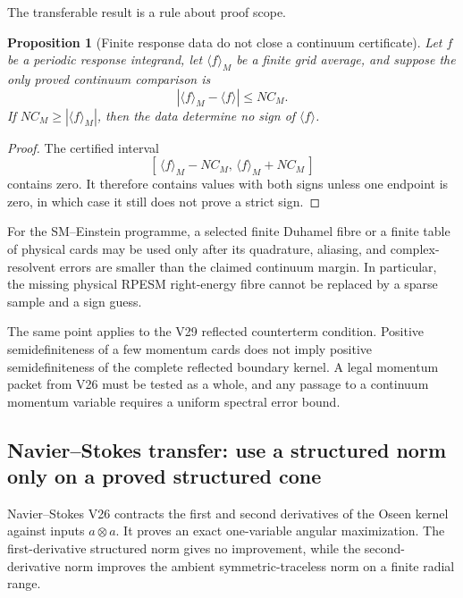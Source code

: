 \documentclass[11pt]{article}
\newtheorem{proposition}[theorem]{Proposition}
\theoremstyle{remark}
\begin{document}
The transferable result is a rule about proof scope.

\begin{proposition}[Finite response data do not close a continuum
certificate]
\label{prop:v12v30-finite-not-continuum}
Let \(f\) be a periodic response integrand, let
\(\langle f\rangle_M\) be a finite grid average, and suppose the only
proved continuum comparison is
\begin{equation}
 \left|\langle f\rangle_M-\langle f\rangle\right|
 \leq N C_M.                                      \tag{30.3}
\end{equation}
If \(NC_M\geq|\langle f\rangle_M|\), then the data determine no sign
of \(\langle f\rangle\).
\end{proposition}

\begin{proof}
The certified interval
\[
 [\,\langle f\rangle_M-NC_M,\,
    \langle f\rangle_M+NC_M\,]
\]
contains zero.  It therefore contains values with both signs unless
one endpoint is zero, in which case it still does not prove a strict
sign.
\end{proof}

For the SM--Einstein programme, a selected finite Duhamel fibre or a
finite table of physical cards may be used only after its quadrature,
aliasing, and complex-resolvent errors are smaller than the claimed
continuum margin.  In particular, the missing physical RPESM
right-energy fibre cannot be replaced by a sparse sample and a sign
guess.

The same point applies to the V29 reflected counterterm condition.
Positive semidefiniteness of a few momentum cards does not imply
positive semidefiniteness of the complete reflected boundary kernel.
A legal momentum packet from V26 must be tested as a whole, and any
passage to a continuum momentum variable requires a uniform spectral
error bound.

\subsection{Navier--Stokes transfer: use a structured norm only on a
proved structured cone}

Navier--Stokes V26 contracts the first and second derivatives of the
Oseen kernel against inputs \(a\otimes a\).  It proves an exact
one-variable angular maximization.  The first-derivative structured
norm gives no improvement, while the second-derivative norm improves
the ambient symmetric-traceless norm on a finite radial range.
\end{document}
